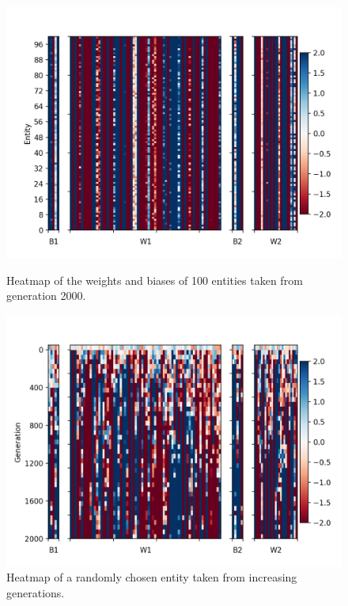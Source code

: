 \documentclass[12pt,a4paper,twoside,openright]{report}
\begin{document}
\begin{figure}[t]
   \centering
   \begin{minipage}{0.49\textwidth}
          \centering
          \captionsetup{width=.9\linewidth}
          \includegraphics[width=1.\linewidth]{results/weights-2000-none2.png}
          \caption{Heatmap of the weights and biases of 100 entities taken from generation 2000.}
          \label{fig:weights-2000}
   \end{minipage}
   \begin{minipage}{0.49\textwidth}
          \centering
          \captionsetup{width=.9\linewidth}
          \includegraphics[width=1.\linewidth]{results/convergence.png}
          \caption{Heatmap of a randomly chosen entity taken from increasing generations.}
          \label{fig:convergence}
   \end{minipage}
\end{figure}
\end{document}
